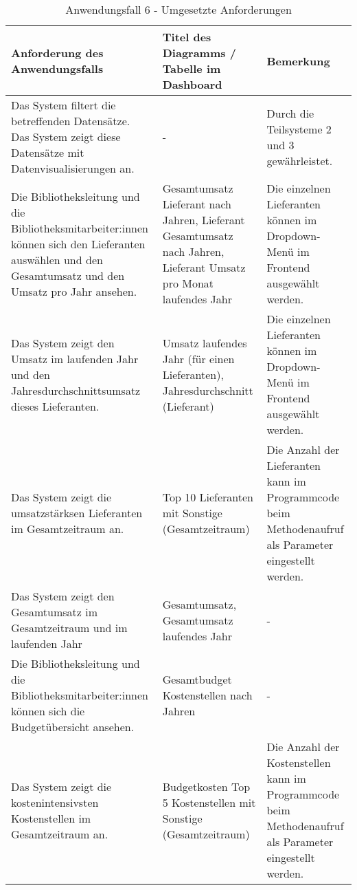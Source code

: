 \begingroup
    \setlength{\tabcolsep}{12pt} %
    \renewcommand{\arraystretch}{1.5} 
    \begin{table}[H]
        \centering
        \begin{adjustbox}{max width=\textwidth}
        \begin{tabular}{p{}p{}p{}}
           \toprule
           Anforderung des Anwendungsfalls        &Titel des Diagramms / Tabelle im Dashboard &Bemerkung\\
           \midrule
           Das System filtert die betreffenden Datensätze. Das System zeigt diese Datensätze mit Datenvisualisierungen an.&-&Durch die Teilsysteme 2 und 3 gewährleistet.\\
           Die Bibliotheksleitung und die Bibliotheksmitarbeiter:innen können sich den Lieferanten auswählen und den Gesamtumsatz und den Umsatz pro Jahr ansehen.&Gesamtumsatz Lieferant nach Jahren, Lieferant Gesamtumsatz nach Jahren, Lieferant Umsatz pro Monat laufendes Jahr&Die einzelnen Lieferanten können im Dropdown-Menü im Frontend ausgewählt werden.\\
           Das System zeigt den Umsatz im laufenden Jahr und den Jahresdurchschnittsumsatz dieses Lieferanten.&Umsatz laufendes Jahr (für einen Lieferanten), Jahresdurchschnitt (Lieferant)&Die einzelnen Lieferanten können im Dropdown-Menü im Frontend ausgewählt werden.\\
           Das System zeigt die umsatzstärksen Lieferanten im Gesamtzeitraum an.&Top 10 Lieferanten mit Sonstige (Gesamtzeitraum) &Die Anzahl der Lieferanten kann im Programmcode beim Methodenaufruf als Parameter eingestellt werden.\\
           Das System zeigt den Gesamtumsatz im Gesamtzeitraum und im laufenden Jahr&Gesamtumsatz, Gesamtumsatz laufendes Jahr&-\\
           Die Bibliotheksleitung und die Bibliotheksmitarbeiter:innen können sich die Budgetübersicht ansehen.&Gesamtbudget Kostenstellen nach Jahren&-\\
           Das System zeigt die kostenintensivsten Kostenstellen im Gesamtzeitraum an.&Budgetkosten Top 5 Kostenstellen mit Sonstige (Gesamtzeitraum)&Die Anzahl der Kostenstellen kann im Programmcode beim Methodenaufruf als Parameter eingestellt werden.\\
        \bottomrule
        \end{tabular}
        \end{adjustbox}
        \caption{%
            Anwendungsfall 6 - Umgesetzte Anforderungen
        }
        \label{tab:Anwendungsfall 6 - Umgesetzte Anforderungen}
        \end{table}

